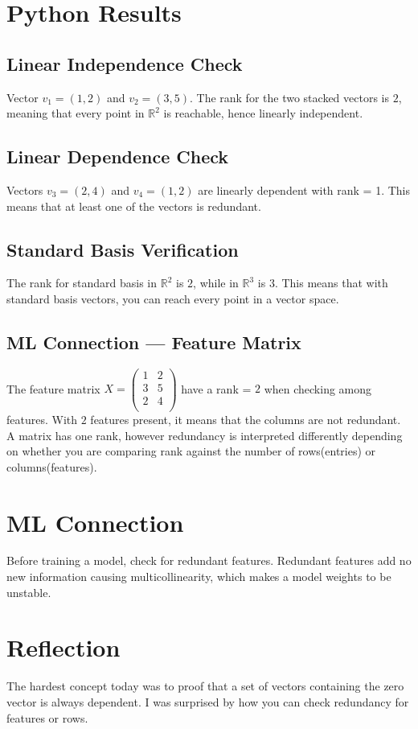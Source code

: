 \documentclass[11pt]{article}
\begin{document}
\section{Python Results}

\subsection{Linear Independence Check}
Vector $v_1 = (1, 2)$ and $v_2 = (3, 5)$. The rank for the two stacked vectors is $2$, meaning that every point in $\mathbb{R}^2$ is reachable, hence linearly independent.
\subsection{Linear Dependence Check}
Vectors $v_3 = (2, 4)$ and $v_4 = (1, 2)$ are linearly dependent with rank = 1. This means that at least one of the vectors is redundant.
\subsection{Standard Basis Verification}
The rank for standard basis in $\mathbb{R}^2$ is $2$, while in $\mathbb{R}^3$ is $3$. This means that with standard basis vectors, you can reach every point in a vector space.

\subsection{ML Connection — Feature Matrix}
The feature matrix $X = \begin{pmatrix}
	1 & 2\\
	3 & 5\\
	2 & 4\\
\end{pmatrix}
$ have a rank = $2$ when checking among features. With $2$ features present, it means that the columns are not redundant. A matrix has one rank, however redundancy is interpreted differently depending on whether you are comparing rank against the number of rows(entries) or columns(features).
\section{ML Connection}
Before training a model, check for redundant features. Redundant features add no new information  causing multicollinearity, which makes a model weights to be unstable. 

\section{Reflection}
The hardest concept today was to proof that a set of vectors containing the zero vector is always dependent. I was surprised by how you can check redundancy for features or rows.
\end{document}

